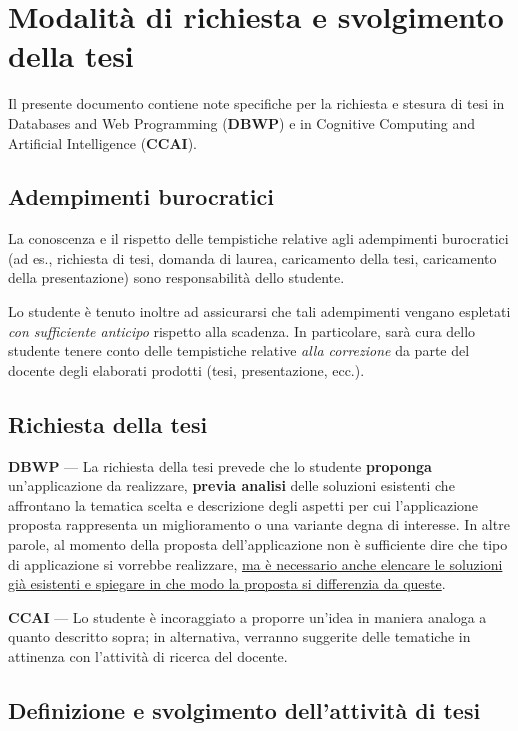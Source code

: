 \clearpage{\pagestyle{empty}\cleardoublepage}
\chapter{Modalità di richiesta e svolgimento della tesi}
\label{chap:tesi}

Il presente documento contiene note specifiche per la richiesta e stesura di tesi in Databases and Web Programming (\textbf{DBWP}) e in Cognitive Computing and Artificial Intelligence (\textbf{CCAI}).

\section{Adempimenti burocratici}

La conoscenza e il rispetto delle tempistiche relative agli adempimenti burocratici (ad es., richiesta di tesi, domanda di laurea, caricamento della tesi, caricamento della presentazione) sono responsabilità dello studente.

Lo studente è tenuto inoltre ad assicurarsi che tali adempimenti vengano espletati \emph{con sufficiente anticipo} rispetto alla scadenza. In particolare, sarà cura dello studente tenere conto delle tempistiche relative \emph{alla correzione} da parte del docente degli elaborati prodotti (tesi, presentazione, ecc.).

\section{Richiesta della tesi}

\textbf{DBWP} --- La richiesta della tesi prevede che lo studente \textbf{proponga} un'applicazione da realizzare, \textbf{previa analisi} delle soluzioni esistenti che affrontano la tematica scelta e descrizione degli aspetti per cui l'applicazione proposta rappresenta un miglioramento o una variante degna di interesse. In altre parole, al momento della proposta dell'applicazione non è sufficiente dire che tipo di applicazione si vorrebbe realizzare, \ul{ma è necessario anche elencare le soluzioni già esistenti e spiegare in che modo la proposta si differenzia da queste}. 

\noindent\textbf{CCAI} --- Lo studente è incoraggiato a proporre un'idea in maniera analoga a quanto descritto sopra; in alternativa, verranno suggerite delle tematiche in attinenza con l'attività di ricerca del docente.

\section{Definizione e svolgimento dell'attività di tesi}

